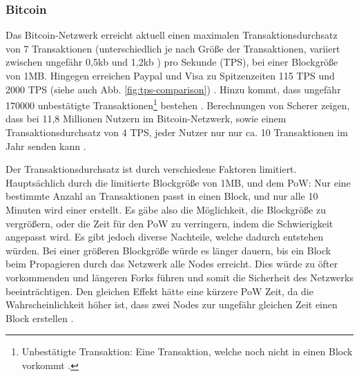 \subsubsection{Bitcoin}
Das Bitcoin-Netzwerk erreicht aktuell einen maximalen Transaktionsdurchsatz von 7 Transaktionen (unterschiedlich je nach Größe der Transaktionen, variiert zwischen ungefähr 0,5kb und 1,2kb \cite{Bitcoin.comTeamBitcoinTransactionSize}) pro Sekunde (TPS), bei einer Blockgröße von 1MB. Hingegen erreichen Paypal und Visa zu Spitzenzeiten 115 TPS und 2000 TPS (siehe auch Abb. \ref{fig:tps-comparison}) \cite{BitcoinTeamScalabilityBitcoinWiki}. Hinzu kommt, dass ungefähr 170000 unbestätigte Transaktionen\footnote{Unbestätigte Transaktion: Eine Transaktion, welche noch nicht in einen Block vorkommt \cite{AntonopoulosMasteringbitcoin2015}.} bestehen \cite{BlockchainUnternehmenUnbestatigteTransaktionenBitcoin}. Berechnungen von Scherer zeigen, dass bei 11,8 Millionen Nutzern im Bitcoin-Netzwerk, sowie einem Transaktionsdurchsatz von 4 TPS, jeder Nutzer nur nur ca. 10 Transaktionen im Jahr senden kann \cite{SchererPerformanceScalabilityBlockchain2017}.

Der Transaktionsdurchsatz ist durch verschiedene Faktoren limitiert. Hauptsächlich durch die limitierte Blockgröße von 1MB, und dem PoW: Nur eine bestimmte Anzahl an Transaktionen passt in einen Block, und nur alle 10 Minuten wird einer erstellt. Es gäbe also die Möglichkeit, die Blockgröße zu vergrößern, oder die Zeit für den PoW zu verringern, indem die Schwierigkeit angepasst wird. Es gibt jedoch diverse Nachteile, welche dadurch entstehen würden. Bei einer größeren Blockgröße würde es länger dauern, bis ein Block beim Propagieren durch das Netzwerk alle Nodes erreicht. Dies würde zu öfter vorkommenden und längeren Forks führen und somit die Sicherheit des Netzwerks beeinträchtigen. Den gleichen Effekt hätte eine kürzere PoW Zeit, da die Wahrscheinlichkeit höher ist, dass zwei Nodes zur ungefähr gleichen Zeit einen Block erstellen \cite{SchererPerformanceScalabilityBlockchain2017} \cite{EthereumTeamEthereumWhitePaper2017} \cite{SompolinskyAcceleratingBitcoinTransaction2013}. 

